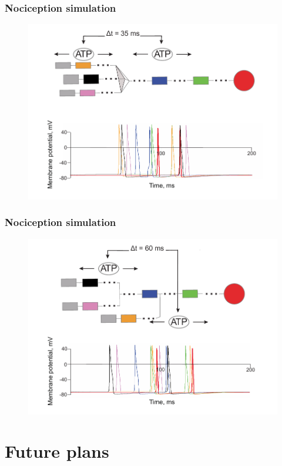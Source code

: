 \documentclass[12pt, aspectratio=169]{beamer}
\begin{document}
\begin{frame}
  \frametitle{Nociception simulation}
  \begin{figure}
    \includegraphics[width=0.7\linewidth]{2_2.pdf}
  \end{figure}
\end{frame}
\begin{frame}
  \frametitle{Nociception simulation}
  \begin{figure}
    \includegraphics[width=0.7\linewidth]{2_3.pdf}
  \end{figure}
\end{frame}

\section{Future plans}
\end{document}
